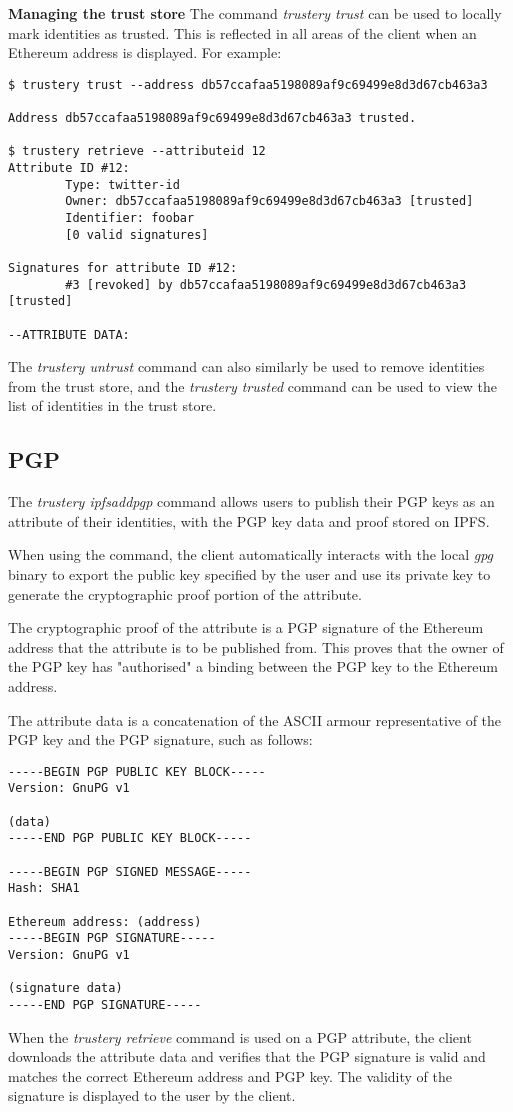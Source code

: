 \documentclass[12pt,a4paper]{report}
\begin{document}
	\bigskip
	\noindent \textbf{Managing the trust store}\newline
	The command \textit{trustery trust} can be used to locally mark identities as trusted. This is reflected in all areas of the client when an Ethereum address is displayed. For example:
	\begin{lstlisting}
$ trustery trust --address db57ccafaa5198089af9c69499e8d3d67cb463a3

Address db57ccafaa5198089af9c69499e8d3d67cb463a3 trusted.

$ trustery retrieve --attributeid 12
Attribute ID #12:
        Type: twitter-id
        Owner: db57ccafaa5198089af9c69499e8d3d67cb463a3 [trusted]
        Identifier: foobar
        [0 valid signatures]

Signatures for attribute ID #12:
        #3 [revoked] by db57ccafaa5198089af9c69499e8d3d67cb463a3 [trusted]

--ATTRIBUTE DATA:

	\end{lstlisting}
	The \textit{trustery untrust} command can also similarly be used to remove identities from the trust store, and the \textit{trustery trusted} command can be used to view the list of identities in the trust store.
	
	\subsection{PGP}
	The \textit{trustery ipfsaddpgp} command allows users to publish their PGP keys as an attribute of their identities, with the PGP key data and proof stored on IPFS.
	
	When using the command, the client automatically interacts with the local \textit{gpg} binary to export the public key specified by the user and use its private key to generate the cryptographic proof portion of the attribute.
	
	The cryptographic proof of the attribute is a PGP signature of the Ethereum address that the attribute is to be published from. This proves that the owner of the PGP key has "authorised" a binding between the PGP key to the Ethereum address.
	
	The attribute data is a concatenation of the ASCII armour representative of the PGP key and the PGP signature, such as follows:
	\begin{lstlisting}
-----BEGIN PGP PUBLIC KEY BLOCK-----
Version: GnuPG v1

(data)
-----END PGP PUBLIC KEY BLOCK-----

-----BEGIN PGP SIGNED MESSAGE-----
Hash: SHA1

Ethereum address: (address)
-----BEGIN PGP SIGNATURE-----
Version: GnuPG v1

(signature data)
-----END PGP SIGNATURE-----
	\end{lstlisting}
	When the \textit{trustery retrieve} command is used on a PGP attribute, the client downloads the attribute data and verifies that the PGP signature is valid and matches the correct Ethereum address and PGP key. The validity of the signature is displayed to the user by the client.
	
\end{document}
